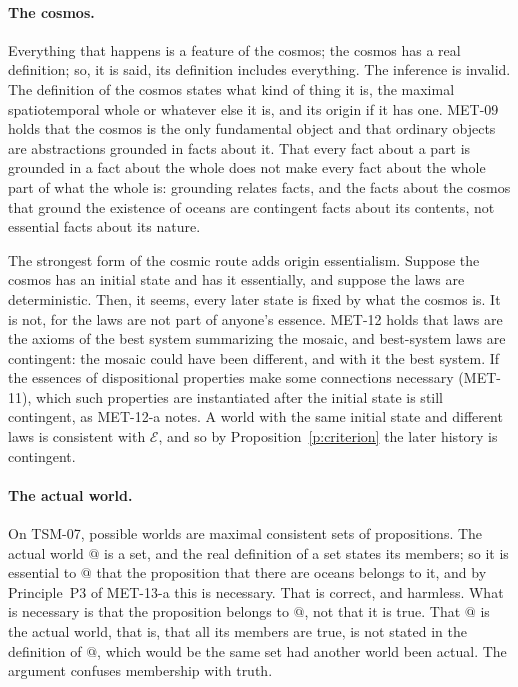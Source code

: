 \documentclass{situationist-preprint}
\begin{document}
\paragraph{The cosmos.} Everything that happens is a feature of the cosmos; the cosmos has a real definition; so, it is said, its definition includes everything. The inference is invalid. The definition of the cosmos states what kind of thing it is, the maximal spatiotemporal whole or whatever else it is, and its origin if it has one. MET-09 holds that the cosmos is the only fundamental object and that ordinary objects are abstractions grounded in facts about it. That every fact about a part is grounded in a fact about the whole does not make every fact about the whole part of what the whole is: grounding relates facts, and the facts about the cosmos that ground the existence of oceans are contingent facts about its contents, not essential facts about its nature.

The strongest form of the cosmic route adds origin essentialism. Suppose the cosmos has an initial state and has it essentially, and suppose the laws are deterministic. Then, it seems, every later state is fixed by what the cosmos is. It is not, for the laws are not part of anyone's essence. MET-12 holds that laws are the axioms of the best system summarizing the mosaic, and best-system laws are contingent: the mosaic could have been different, and with it the best system. If the essences of dispositional properties make some connections necessary (MET-11), which such properties are instantiated after the initial state is still contingent, as MET-12-a notes. A world with the same initial state and different laws is consistent with $\mathcal{E}$, and so by Proposition~\ref{p:criterion} the later history is contingent.

\paragraph{The actual world.} On TSM-07, possible worlds are maximal consistent sets of propositions. The actual world $@$ is a set, and the real definition of a set states its members; so it is essential to $@$ that the proposition that there are oceans belongs to it, and by Principle~P3 of MET-13-a this is necessary. That is correct, and harmless. What is necessary is that the proposition belongs to $@$, not that it is true. That $@$ is the actual world, that is, that all its members are true, is not stated in the definition of $@$, which would be the same set had another world been actual. The argument confuses membership with truth.
\end{document}
